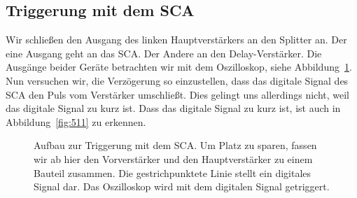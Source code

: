 \subsection{Triggerung mit dem SCA}

Wir schließen den Ausgang des linken Hauptverstärkers an den Splitter an. Der
eine Ausgang geht an das SCA. Der Andere an den Delay-Verstärker. Die Ausgänge
beider Geräte betrachten wir mit dem Oszilloskop, siehe
Abbildung~\ref{fig:aufbau:sca_trigger}. Nun versuchen wir, die Verzögerung so
einzustellen, dass das digitale Signal des SCA den Puls vom Verstärker
umschließt. Dies gelingt uns allerdings nicht, weil das digitale Signal zu kurz
ist. Dass das digitale Signal zu kurz ist, ist auch in Abbildung~\ref{fig:511}
zu erkennen.

\begin{figure}[htbp]
    \centering
    \caption{%
        Aufbau zur Triggerung mit dem SCA. Um Platz zu sparen, fassen wir ab
        hier den Vorverstärker und den Hauptverstärker zu einem Bauteil
        zusammen. Die gestrichpunktete Linie stellt ein digitales Signal dar.
        Das Oszilloskop wird mit dem digitalen Signal getriggert.
    }
    \label{fig:aufbau:sca_trigger}
\end{figure}

